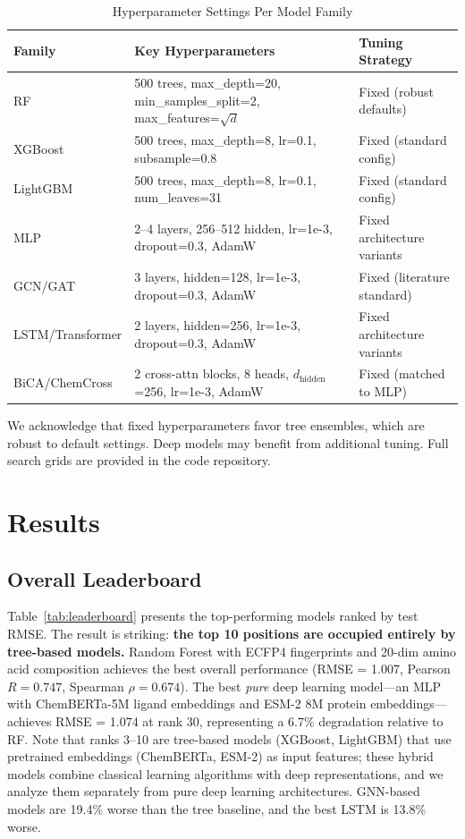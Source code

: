 \documentclass[11pt,twocolumn,a4paper]{article}
\begin{document}
\begin{table}[t]
\centering
\caption{Hyperparameter Settings Per Model Family}
\label{tab:hparams}
\begin{tabular}{lp{5.5cm}p{5.5cm}}
\toprule
\textbf{Family} & \textbf{Key Hyperparameters} & \textbf{Tuning Strategy} \\
\midrule
RF & 500 trees, max\_depth=20, min\_samples\_split=2, max\_features=$\sqrt{d}$ & Fixed (robust defaults) \\
XGBoost & 500 trees, max\_depth=8, lr=0.1, subsample=0.8 & Fixed (standard config) \\
LightGBM & 500 trees, max\_depth=8, lr=0.1, num\_leaves=31 & Fixed (standard config) \\
MLP & 2--4 layers, 256--512 hidden, lr=1e-3, dropout=0.3, AdamW & Fixed architecture variants \\
GCN/GAT & 3 layers, hidden=128, lr=1e-3, dropout=0.3, AdamW & Fixed (literature standard) \\
LSTM/Transformer & 2 layers, hidden=256, lr=1e-3, dropout=0.3, AdamW & Fixed architecture variants \\
BiCA/ChemCross & 2 cross-attn blocks, 8 heads, $d_\text{hidden}$=256, lr=1e-3, AdamW & Fixed (matched to MLP) \\
\bottomrule
\end{tabular}
\vspace{4pt}
\footnotesize{We acknowledge that fixed hyperparameters favor tree ensembles, which are robust to default settings. Deep models may benefit from additional tuning. Full search grids are provided in the code repository.}
\end{table}

\section{Results}

\subsection{Overall Leaderboard}

Table~\ref{tab:leaderboard} presents the top-performing models ranked by test RMSE. The result is striking: \textbf{the top 10 positions are occupied entirely by tree-based models.} Random Forest with ECFP4 fingerprints and 20-dim amino acid composition achieves the best overall performance (RMSE = 1.007, Pearson $R = 0.747$, Spearman $\rho = 0.674$). The best \emph{pure} deep learning model---an MLP with ChemBERTa-5M ligand embeddings and ESM-2 8M protein embeddings---achieves RMSE = 1.074 at rank 30, representing a 6.7\% degradation relative to RF. Note that ranks 3--10 are tree-based models (XGBoost, LightGBM) that use pretrained embeddings (ChemBERTa, ESM-2) as input features; these hybrid models combine classical learning algorithms with deep representations, and we analyze them separately from pure deep learning architectures. GNN-based models are 19.4\% worse than the tree baseline, and the best LSTM is 13.8\% worse.
\end{document}
